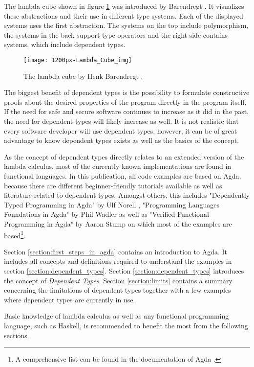 The lambda cube shown in figure \ref{fig:lambda_cube} was introduced by Barendregt \cite{lambda_cube}. It visualizes these abstractions and their use in different type systems. Each of the displayed systems uses the first abstraction. 
The systems on the top include polymorphism, the systems in the back support type operators and the right side contains systems, which include dependent types.
\begin{figure}[h]
\centering
\texttt{[image: 1200px-Lambda\_Cube\_img]}
\caption{The lambda cube by Henk Barendregt \cite{lambda_cube}.}
\label{fig:lambda_cube}
\end{figure}

The biggest benefit of dependent types is the possibility to formulate constructive proofs about the desired properties of the program directly in the program itself.
If the need for safe and secure software continues to increase as it did in the past, the need for dependent types will likely increase as well.
It is not realistic that every software developer will use dependent types, however, it can be of great advantage to know dependent types exists as well as the basics of the concept.

As the concept of dependent types directly relates to an extended version of the lambda calculus, most of the currently known implementations are found in functional languages.
In this publication, all code examples are based on Agda, because there are different beginner-friendly tutorials available as well as literature related to dependent types. 
Amongst others, this includes "Dependently Typed Programming in Agda" by Ulf Norell \cite{norell:deptyped}, "Programming Languages Foundations in Agda" by Phil Wadler \cite{plfa2019} as well as "Verified Functional Programming in Agda" by Aaron Stump \cite{10.1145/2841316} on which most of the examples are based\footnote{A comprehensive list can be found in the documentation of Agda \cite{AgdaReadTheDocs}.}.

Section \ref{section:first_steps_in_agda} contains an introduction to Agda.
It includes all concepts and definitions required to understand the examples in section \ref{section:dependent_types}.
Section \ref{section:dependent_types} introduces the concept of \emph{Dependent Types}.
Section \ref{section:limits} contains a summary concerning the limitations of dependent types together with a few examples where dependent types are currently in use.

Basic knowledge of lambda calculus as well as any functional programming language, such as Haskell, is recommended to benefit the most from the following sections.
